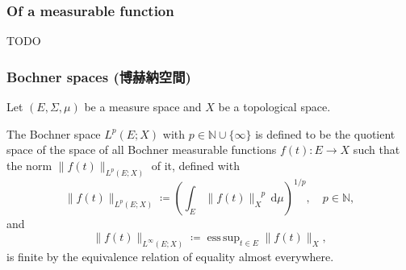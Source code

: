 \subsubsection{Of a measurable function}
TODO
\subsubsection{Bochner spaces (博赫納空間)}
Let $(E,\Sigma,\mu)$ be a measure space and $X$ be a topological space. 

The Bochner space $L^p(E;X)$ with $p\in\mathbb{N}\cup\{\infty\}$ is defined to be the quotient space of the space of all Bochner measurable functions $f(t)\colon E\to X$ such that the norm $\|f(t)\|_{L^p(E;X)}$ of it, defined with
\[\|f(t)\|_{L^p(E;X)}\coloneq\left(\int_E\|f(t)\|_X^{\phantom{X}p}\,\mathrm{d}\mu\right)^{1/p},\quad p\in\mathbb{N},\]
and
\[\|f(t)\|_{L^{\infty }(E;X)}\coloneq\operatorname{ess\,sup}_{t\in E}\|f(t)\|_{X},\]
is finite by the equivalence relation of equality almost everywhere.
